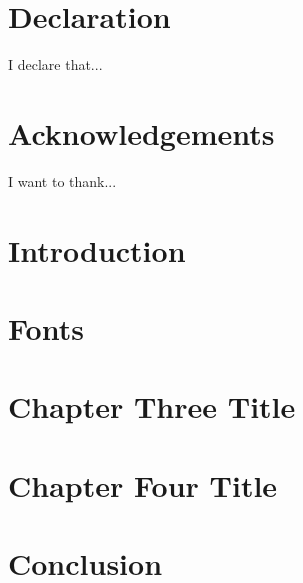  
\chapter*{Declaration}
I declare that...

 
\chapter*{Acknowledgements}
I want to thank...



\mainmatter %

\chapter{Introduction}
 
\chapter{Fonts}
 
\chapter{Chapter Three Title}
 
\chapter{Chapter Four Title}
 
\chapter{Conclusion}

